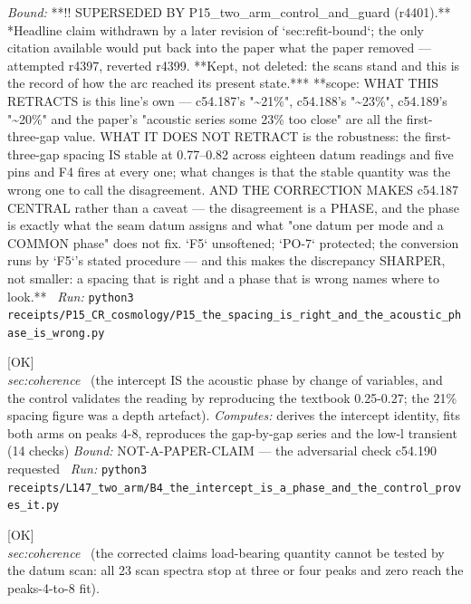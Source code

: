 \begin{description}
 \emph{Bound:} **!! SUPERSEDED BY P15\_two\_arm\_control\_and\_guard (r4401).** *Headline claim withdrawn by a later revision of `sec:refit-bound`; the only citation available would put back into the paper what the paper removed --- attempted r4397, reverted r4399. **Kept, not deleted: the scans stand and this is the record of how the arc reached its present state.*** **scope: WHAT THIS RETRACTS is this line's own --- c54.187's "\textasciitilde{}21\%", c54.188's "\textasciitilde{}23\%", c54.189's "\textasciitilde{}20\%" and the paper's "acoustic series some 23\% too close" are all the first-three-gap value. WHAT IT DOES NOT RETRACT is the robustness: the first-three-gap spacing IS stable at 0.77--0.82 across eighteen datum readings and five pins and F4 fires at every one; what changes is that the stable quantity was the wrong one to call the disagreement. AND THE CORRECTION MAKES c54.187 CENTRAL rather than a caveat --- the disagreement is a PHASE, and the phase is exactly what the seam datum assigns and what "one datum per mode and a COMMON phase" does not fix. `F5` unsoftened; `PO-7` protected; the conversion runs by `F5`'s stated procedure --- and this makes the discrepancy SHARPER, not smaller: a spacing that is right and a phase that is wrong names where to look.**
\ \emph{Run:} \texttt{python3 receipts/P15\_CR\_cosmology/P15\_the\_spacing\_is\_right\_and\_the\_acoustic\_phase\_is\_wrong.py}
\item[\label{rcpt:B4_the_intercept_is_a_phase_and_the_control_proves_it}\texttt{B4\_the\_intercept\_is\_a\_phase\_and\_the\_control\_proves\_it}]\hfill\textsf{[OK]}\\
\textit{sec:coherence} \ (the intercept IS the acoustic phase by change of variables, and the control validates the reading by reproducing the textbook 0.25-0.27; the 21\% spacing figure was a depth artefact). 
\emph{Computes:} derives the intercept identity, fits both arms on peaks 4-8, reproduces the gap-by-gap series and the low-l transient (14 checks)
 \emph{Bound:} NOT-A-PAPER-CLAIM --- the adversarial check c54.190 requested
\ \emph{Run:} \texttt{python3 receipts/L147\_two\_arm/B4\_the\_intercept\_is\_a\_phase\_and\_the\_control\_proves\_it.py}
\item[\label{rcpt:B5_the_scan_cannot_test_the_asymptotic_phase}\texttt{B5\_the\_scan\_cannot\_test\_the\_asymptotic\_phase}]\hfill\textsf{[OK]}\\
\textit{sec:coherence} \ (the corrected claims load-bearing quantity cannot be tested by the datum scan: all 23 scan spectra stop at three or four peaks and zero reach the peaks-4-to-8 fit). 

\end{description}
